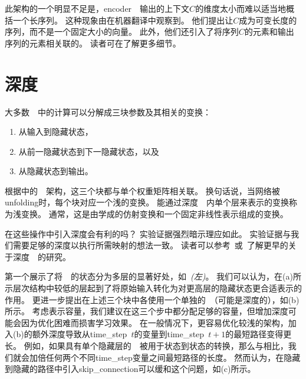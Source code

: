 此架构的一个明显不足是，\gls{encoder}~~输出的上下文$C$的维度太小而难以适当地概括一个长序列。
这种现象由\cite{Bahdanau-et-al-ICLR2015-small}在机器翻译中观察到。
他们提出让$C$成为可变长度的序列，而不是一个固定大小的向量。
此外，他们还引入了将序列$C$的元素和输出序列的元素相关联的。
读者可在了解更多细节。


\section{深度}
\label{sec:deep_recurrent_networks}
大多数~~中的计算可以分解成三块参数及其相关的变换：
\begin{enumerate}
 \item 从输入到隐藏状态，
 \item 从前一隐藏状态到下一隐藏状态，以及
 \item 从隐藏状态到输出。
\end{enumerate}
根据中的~~架构，这三个块都与单个权重矩阵相关联。
换句话说，当网络被\gls{unfolding}时，每个块对应一个浅的变换。
能通过深度~~内单个层来表示的变换称为浅变换。
通常，这是由学成的仿射变换和一个固定非线性表示组成的变换。

在这些操作中引入深度会有利的吗？
实验证据\citep{Graves-et-al-ICASSP2013,Pascanu-et-al-ICLR2014}强烈暗示理应如此。
实验证据与我们需要足够的深度以执行所需映射的想法一致。
读者可以参考~\cite{schmidhuber_learning_1992,ElHihi+Bengio-nips8}或~\cite{Jaeger2007}了解更早的关于深度~~的研究。

\cite{Graves-et-al-ICASSP2013}第一个展示了将~~的状态分为多层的显著好处，如~\emph{(左)}。
我们可以认为，在(a)所示层次结构中较低的层起到了将原始输入转化为对更高层的隐藏状态更合适表示的作用。
\cite{Pascanu-et-al-ICLR2014}更进一步提出在上述三个块中各使用一个单独的~（可能是深度的），如(b)所示。
考虑表示容量，我们建议在这三个步中都分配足够的容量，但增加深度可能会因为优化困难而损害学习效果。
在一般情况下，更容易优化较浅的架构，加入(b)的额外深度导致从\gls{time_step}~$t$的变量到\gls{time_step}~$t+1$的最短路径变得更长。
例如，如果具有单个隐藏层的~~被用于状态到状态的转换，那么与相比，我们就会加倍任何两个不同\gls{time_step}变量之间最短路径的长度。
然而\cite{Pascanu-et-al-ICLR2014}认为，在隐藏到隐藏的路径中引入\gls{skip_connection}可以缓和这个问题，如(c)所示。

